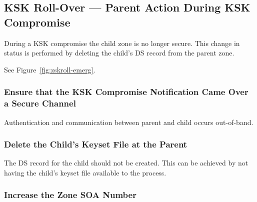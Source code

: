 
\clearpage
\subsection{KSK Roll-Over --- Parent Action During KSK Compromise}
\label{roll-emergency-parent-ksk}

During a KSK compromise the child zone is no longer secure. This change in
status is performed by deleting the child's DS record from the parent zone.

See Figure~\ref{fig:zskroll-emerg}.


\subsubsection{Ensure that the KSK Compromise Notification Came Over a Secure
Channel}

Authentication and communication between parent and child occurs out-of-band.


\subsubsection{Delete the Child's Keyset File at the Parent}

The DS record for the child should not be created. This can be achieved by
not having the child's keyset file available to the 
process.


\subsubsection{Increase the Zone SOA Number}


